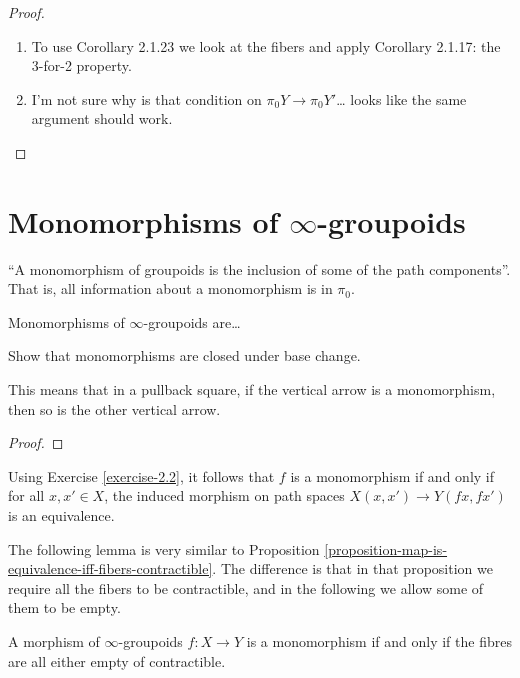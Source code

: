 \begin{proof}
\begin{enumerate}
\item To use Corollary 2.1.23 we look at the fibers and apply
 Corollary 2.1.17: the 3-for-2 property.
\item I'm not sure why is that condition on
$\pi_0Y \to \pi_0Y'$… looks like the same argument should work.
\end{enumerate}
\end{proof}

\section{Monomorphisms of $\infty$-groupoids}
\label{section-monomorphisms}

\noindent
``A monomorphism of groupoids is the inclusion of
some of the path components''. That is, all information
about a monomorphism is in $\pi_0$.

Monomorphisms of $\infty$-groupoids are…

\begin{exercise}[2.6]
\label{exercise-2.6}
Show that monomorphisms are closed
under base change.
\end{exercise}

This means that in a pullback square,
if the vertical arrow
is a monomorphism, then so is the
other vertical arrow.

\begin{proof}

\end{proof}

\begin{remark}
\label{remark-monomorphism-equivalence}
Using Exercise \ref{exercise-2.2}, it follows that $f$ is a monomorphism
if and only if for all $x,x' \in X$, the induced
morphism on path spaces $X(x,x') \to Y(fx,fx')$ is
an equivalence.
\end{remark}


\noindent
The following lemma is very similar to
Proposition \ref{proposition-map-is-equivalence-iff-fibers-contractible}.
The difference is that in that proposition we
require all the fibers to be contractible,
and in the following we allow some of them to be empty.

\begin{lemma}
\label{lemma-monomorphism-iff-fibres-are-empty-or-contractible}
A morphism of $\infty$-groupoids $f:X \to Y$ is
a monomorphism if and only if the fibres are all
either empty of contractible.
\end{lemma}

